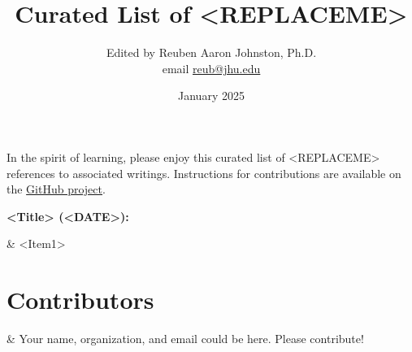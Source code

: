 \documentclass[a4paper]{article}
\title{Curated List of <REPLACEME>}
\author{Edited by Reuben Aaron Johnston, Ph.D. \\ email \href{mailto:reub@jhu.edu}{reub@jhu.edu}}
\date{January 2025}
\begin{document}
	\maketitle
	
	In the spirit of learning, please enjoy this curated list of <REPLACEME> references to associated writings.  Instructions for contributions are available on the \href{https://github.com/reubenajohnston/CuratedCyberReads}{GitHub project}.
	
	\bigskip\noindent

	\noindent\textbf{<Title> (<DATE>):}
	\begin{easylist}[itemize]
	& <Item1>
  	\end{easylist}  

	\section*{Contributors}
 	\begin{easylist}[itemize]
  	& Your name, organization, and email could be here.  Please contribute!
	\end{easylist}
\end{document}
